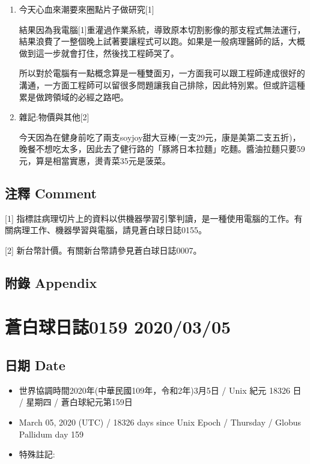 \documentclass[a5paper, 12pt
]{book}
\providecommand{\tightlist}{%
  \setlength{\itemsep}{0pt}\setlength{\parskip}{0pt}}
\begin{document}
\begin{enumerate}
\def\labelenumi{\arabic{enumi}.}
\item
  今天心血來潮要來圈點片子做研究{[}1{]}

  結果因為我電腦{[}1{]}重灌過作業系統，導致原本切割影像的那支程式無法運行，結果浪費了一整個晚上試著要讓程式可以跑。如果是一般病理醫師的話，大概做到這一步就會打住，然後找工程師哭了。

  所以對於電腦有一點概念算是一種雙面刃，一方面我可以跟工程師達成很好的溝通，一方面工程師可以留很多問題讓我自己排除，因此特別累。但或許這種累是做跨領域的必經之路吧。
\item
  雜記:物價與其他{[}2{]}

  今天因為在健身前吃了兩支soyjoy甜大豆棒(一支29元，康是美第二支五折)，晚餐不想吃太多，因此去了健行路的「豚將日本拉麵」吃麵。醬油拉麵只要59元，算是相當實惠，燙青菜35元是菠菜。
\end{enumerate}

\hypertarget{ux6ce8ux91cb-comment-3}{%
\subsection{注釋 Comment}\label{ux6ce8ux91cb-comment-3}}

{[}1{]}
指標註病理切片上的資料以供機器學習引擎判讀，是一種使用電腦的工作。有關病理工作、機器學習與電腦，請見蒼白球日誌0155。

{[}2{]} 新台幣計價。有關新台幣請參見蒼白球日誌0007。

\hypertarget{ux9644ux9304-appendix-3}{%
\subsection{附錄 Appendix}\label{ux9644ux9304-appendix-3}}

\hypertarget{ux84bcux767dux7403ux65e5ux8a8c0159-20200305}{%
\section{蒼白球日誌0159
2020/03/05}\label{ux84bcux767dux7403ux65e5ux8a8c0159-20200305}}

\hypertarget{ux65e5ux671f-date-4}{%
\subsection{日期 Date}\label{ux65e5ux671f-date-4}}

\begin{itemize}
\tightlist
\item
  世界協調時間2020年(中華民國109年，令和2年)3月5日 / Unix 紀元 18326 日
  / 星期四 / 蒼白球紀元第159日
\item
  March 05, 2020 (UTC) / 18326 days since Unix Epoch / Thursday / Globus
  Pallidum day 159
\item
  特殊註記:
\end{itemize}
\end{document}
